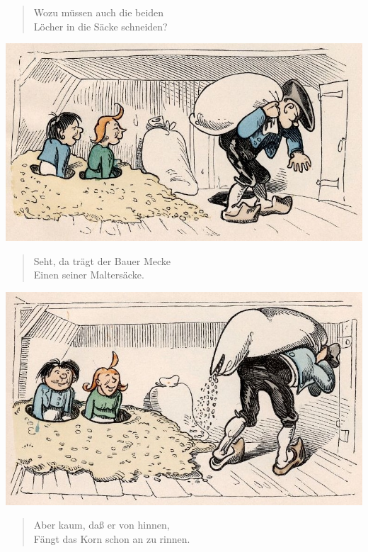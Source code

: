 \documentclass[a4paper,12pt]{article}
\begin{document}
\begin{verse}
Wozu müssen auch die beiden\\{}
Löcher in die Säcke schneiden?
\end{verse}



\begin{center}\includegraphics[scale=.7, alt={Bauer Mecke}]{images/7-02.jpg}\end{center}



\begin{verse}
Seht, da trägt der Bauer Mecke\\{}
Einen seiner Maltersäcke.
\end{verse}



\begin{center}\includegraphics[scale=.7, alt={Die Säcke rinnen}]{images/7-03.jpg}\end{center}



\begin{verse}
Aber kaum, daß er von hinnen,\\{}
Fängt das Korn schon an zu rinnen.
\end{verse}
\end{document}
